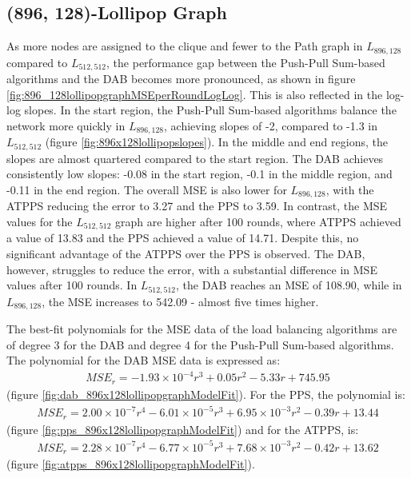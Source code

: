 \subsection{(896, 128)-Lollipop Graph}\label{subsec:896_128lollipop}
As more nodes are assigned to the clique and fewer to the Path graph in $L_{896,128}$ compared to $L_{512,512}$, the performance gap between the Push-Pull Sum-based algorithms and the DAB becomes more pronounced, as shown in figure \ref{fig:896_128lollipopgraphMSEperRoundLogLog}. This is also reflected in the log-log slopes. In the start region, the Push-Pull Sum-based algorithms balance the network more quickly in $L_{896,128}$, achieving slopes of -2, compared to -1.3 in $L_{512,512}$ (figure \ref{fig:896x128lollipopslopes}). In the middle and end regions, the slopes are almost quartered compared to the start region. The DAB achieves consistently low slopes: -0.08 in the start region, -0.1 in the middle region, and -0.11 in the end region. The overall MSE is also lower for $L_{896,128}$, with the ATPPS reducing the error to 3.27 and the PPS to 3.59. In contrast, the MSE values for the $L_{512,512}$ graph are higher after 100 rounds, where ATPPS achieved a value of 13.83 and the PPS achieved a value of 14.71. Despite this, no significant advantage of the ATPPS over the PPS is observed. The DAB, however, struggles to reduce the error, with a substantial difference in MSE values after 100 rounds. In $L_{512,512}$, the DAB reaches an MSE of 108.90, while in $L_{896,128}$, the MSE increases to 542.09 - almost five times higher.

The best-fit polynomials for the MSE data of the load balancing algorithms are of degree 3 for the DAB and degree 4 for the Push-Pull Sum-based algorithms. The polynomial for the DAB MSE data is expressed as:
\begin{align}
    MSE_r=-1.93\times 10^{-4}r^{3}+0.05r^{2}-5.33r+745.95    
\end{align}
(figure \ref{fig:dab_896x128lollipopgraphModelFit}). For the PPS, the polynomial is: 
\begin{align}
    MSE_r=2.00\times 10^{-7}r^{4}-6.01\times 10^{-5}r^{3}+6.95\times 10^{-3}r^{2}-0.39r+13.44
\end{align}
(figure \ref{fig:pps_896x128lollipopgraphModelFit}) and for the ATPPS, is:
\begin{align}
    MSE_r=2.28\times 10^{-7}r^{4}-6.77\times 10^{-5}r^{3}+7.68\times 10^{-3}r^{2}-0.42r+13.62    
\end{align}
(figure \ref{fig:atpps_896x128lollipopgraphModelFit}).

